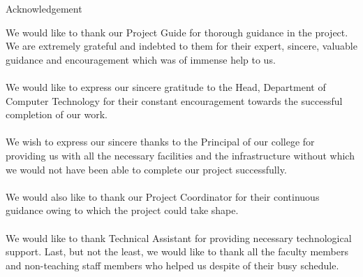 \thispagestyle{empty}

\begin{acknowledgement}
    
    \begin{center}
        \huge{Acknowledgement}
    \end{center}
    
    \vspace{2 em}
    \normalsize \justifying \sloppy
    
    We would like to thank our Project Guide for thorough guidance in the project. We are extremely grateful and indebted to them for their expert, sincere, valuable guidance and encouragement which was of immense help to us.\\

    \\
    
    We would like to express our sincere gratitude to the Head, Department of Computer Technology for their constant encouragement towards the successful completion of our work.\\

    \\
    
    We wish to express our sincere thanks to the Principal of our college for providing us with all the necessary facilities and the infrastructure without which we would not have been able to complete our project successfully.\\

    \\
    
    We would also like to thank our Project Coordinator for their continuous guidance owing to which the project could take shape.\\

    \\
    
    We would like to thank Technical Assistant for providing necessary technological support. Last, but not the least, we would like to thank all the faculty members and non-teaching staff members who helped us despite of their busy schedule.
    
\end{acknowledgement}